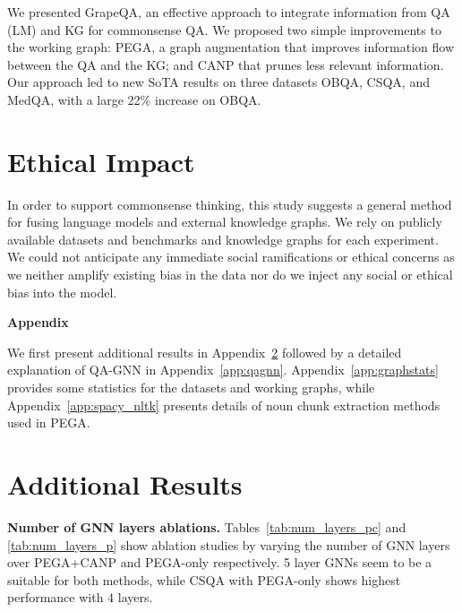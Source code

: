 \documentclass[11pt]{article}
\renewcommand{\paragraph}[1]{\vspace{1mm}\noindent\textbf{#1}}
\begin{document}
We presented GrapeQA, an effective approach to integrate information from QA (LM) and KG for commonsense QA.
We proposed two simple improvements to the working graph:
PEGA, a graph augmentation that improves information flow between the QA and the KG; and
CANP that prunes less relevant information.
Our approach led to new SoTA results on three datasets OBQA, CSQA, and MedQA, with a large 22\% increase on OBQA.


\section{Ethical Impact}
\label{sec:ethical_impact}


In order to support commonsense thinking, this study suggests a general method for fusing language models and external knowledge graphs.
We rely on publicly available datasets and benchmarks and knowledge graphs for each experiment.
We could not anticipate any immediate social ramifications or ethical concerns as we neither amplify existing bias in the data nor do we inject any social or ethical bias into the model.





\appendix
\clearpage
\begin{center}
\textbf{\Large{Appendix}}
\end{center}


We first present additional results in Appendix~\ref{app:more_results} followed by a detailed explanation of QA-GNN in Appendix~\ref{app:qagnn}.
Appendix~\ref{app:graphstats} provides some statistics for the datasets and working graphs, while Appendix~\ref{app:spacy_nltk} presents details of noun chunk extraction methods used in PEGA.

\section{Additional Results}
\label{app:more_results}

\paragraph{Number of GNN layers ablations.}
Tables~\ref{tab:num_layers_pc} and \ref{tab:num_layers_p} show ablation studies by varying the number of GNN layers over PEGA+CANP and PEGA-only respectively.
5 layer GNNs seem to be a suitable for both methods, while CSQA with PEGA-only shows highest performance with 4 layers.
\end{document}
